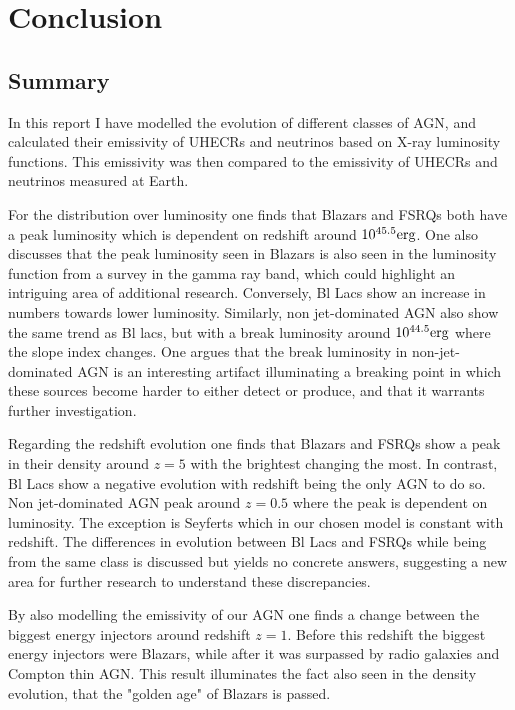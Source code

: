 \section{Conclusion}
\subsection{Summary}
In this report I have modelled the evolution of different classes of AGN, and calculated their emissivity of UHECRs and neutrinos
based on X-ray luminosity functions.
This emissivity was then compared to the emissivity of UHECRs and neutrinos measured at Earth.

For the distribution over luminosity one finds that Blazars and FSRQs both have a peak luminosity which is dependent on redshift around $10^{45.5} \rm erg$. One also discusses that the peak luminosity seen in Blazars is also seen in the luminosity function from a survey in the gamma ray band, which could highlight an intriguing area of additional research.
 Conversely, Bl Lacs
show an increase in numbers towards lower luminosity. Similarly, non jet-dominated AGN also show the same trend as Bl lacs, but with a break luminosity around $10^{44.5} \rm erg$ where the
slope index changes. One argues that the break luminosity in non-jet-dominated AGN is an interesting artifact illuminating a breaking point in which these sources become harder to either detect or produce, and that it warrants further investigation.


Regarding the redshift evolution one finds that  Blazars and FSRQs show a peak in their density around $z = 5$ with the brightest changing the most. In contrast, Bl Lacs 
show a negative evolution with redshift being the only AGN to do so. Non jet-dominated AGN peak around $z =0.5 $ where the peak is dependent on luminosity. The exception is Seyferts which in our chosen model 
is constant with redshift. The differences in evolution between Bl Lacs and FSRQs while being from the same class is discussed but yields no concrete answers, suggesting a new area for further research to understand these discrepancies. 

By also modelling the emissivity of our AGN one finds a change between the biggest energy injectors around redshift $z = 1$. Before this redshift the  biggest energy injectors were Blazars, while after it was surpassed by radio galaxies and Compton thin AGN. This result illuminates the fact also seen in the density evolution, that the "golden age" of Blazars is passed. 

